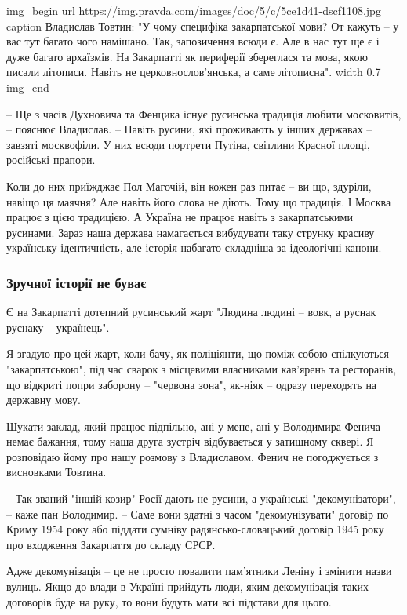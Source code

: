 \ifcmt
img_begin 
        url https://img.pravda.com/images/doc/5/c/5ce1d41-dscf1108.jpg
        caption Владислав Товтин: "У чому специфіка закарпатської мови? От кажуть – у вас тут багато чого намішано. Так, запозичення всюди є. Але в нас тут ще є і дуже багато архаїзмів. На Закарпатті як периферії збереглася та мова, якою писали літописи. Навіть не церковнослов’янська, а саме літописна".
        width 0.7
img_end
\fi

– Ще з часів Духновича та Фенцика існує русинська традиція любити московитів, –
пояснює Владислав. – Навіть русини, які проживають у інших державах – завзяті
москвофіли. У них всюди портрети Путіна, світлини Красної площі, російські
прапори.

Коли до них приїжджає Пол Магочій, він кожен раз питає – ви що, здуріли, навіщо
ця маячня? Але навіть його слова не діють. Тому що традиція. І Москва працює з
цією традицією. А Україна не працює навіть з закарпатськими русинами. Зараз
наша держава намагається вибудувати таку струнку красиву українську
ідентичність, але історія набагато складніша за ідеологічні канони.

\subsubsection{Зручної історії не буває}

Є на Закарпатті дотепний русинський жарт "Людина людині – вовк, а руснак
руснаку – українець".

Я згадую про цей жарт, коли бачу, як поліціянти, що поміж собою спілкуються
"закарпатською", під час сварок з місцевими власниками кав’ярень та ресторанів,
що відкриті попри заборону – "червона зона", як-ніяк – одразу переходять на
державну мову.

Шукати заклад, який працює підпільно, ані у мене, ані у Володимира Фенича немає
бажання, тому наша друга зустріч відбувається у затишному сквері. Я розповідаю
йому про нашу розмову з Владиславом. Фенич не погоджується з висновками
Товтина.  

– Так званий "іншій козир" Росії дають не русини, а українські
"декомунізатори", – каже пан Володимир. – Саме вони здатні з часом
"декомунізувати" договір по Криму 1954 року або піддати сумніву
радянсько-словацький договір 1945 року про входження Закарпаття до складу СРСР.

Адже декомунізація – це не просто повалити пам’ятники Леніну і змінити назви
вулиць. Якщо до влади в Україні прийдуть люди, яким декомунізація таких
договорів буде на руку, то вони будуть мати всі підстави для цього.

